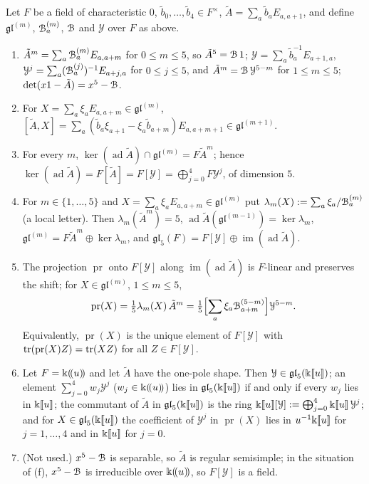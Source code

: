 \begin{lem}
\label{lem:gau-comm}
Let $F$ be a field of characteristic $0$, $\tilde b_0,\dots,\tilde b_4\in F^\times$, $\tilde A=\sum_a\tilde b_aE_{a,a+1}$, and define $\mathfrak{gl}^{(m)}$, $\mathcal{B}^{(m)}_a$, $\mathcal{B}$ and $\mathcal Y$ over $F$ as above.
\begin{enumerate}
\item[(a)] $\tilde A^m=\sum_a\mathcal{B}^{(m)}_aE_{a,a+m}$ for $0\leq m\leq5$, so $\tilde A^5=\mathcal{B}\,1$; $\mathcal Y=\sum_a\tilde b_a^{-1}E_{a+1,a}$, $\mathcal Y^j=\sum_a(\mathcal{B}^{(j)}_a)^{-1}E_{a+j,a}$ for $0\leq j\leq5$, and $\tilde A^m=\mathcal{B}\,\mathcal Y^{5-m}$ for $1\leq m\leq5$; $\det(x1-\tilde A)=x^5-\mathcal{B}$.
\item[(b)] For $X=\sum_a\xi_aE_{a,a+m}\in\mathfrak{gl}^{(m)}$, $[\tilde A,X]=\sum_a(\tilde b_a\xi_{a+1}-\xi_a\tilde b_{a+m})E_{a,a+m+1}\in\mathfrak{gl}^{(m+1)}$.
\item[(c)] For every $m$, $\ker(\operatorname{ad}\tilde A)\cap\mathfrak{gl}^{(m)}=F\tilde A^m$; hence $\ker(\operatorname{ad}\tilde A)=F[\tilde A]=F[\mathcal Y]=\bigoplus_{j=0}^4F\mathcal Y^j$, of dimension $5$.
\item[(d)] For $m\in\{1,\dots,5\}$ and $X=\sum_a\xi_aE_{a,a+m}\in\mathfrak{gl}^{(m)}$ put $\lambda_m(X):=\sum_a\xi_a/\mathcal{B}^{(m)}_a$ (a local letter). Then $\lambda_m(\tilde A^m)=5$, $\operatorname{ad}\tilde A(\mathfrak{gl}^{(m-1)})=\ker\lambda_m$, $\mathfrak{gl}^{(m)}=F\tilde A^m\oplus\ker\lambda_m$, and $\mathfrak{gl}_5(F)=F[\mathcal Y]\oplus\operatorname{im}(\operatorname{ad}\tilde A)$.
\item[(e)] The projection $\operatorname{pr}$ onto $F[\mathcal Y]$ along $\operatorname{im}(\operatorname{ad}\tilde A)$ is $F$-linear and preserves the shift; for $X\in\mathfrak{gl}^{(m)}$, $1\leq m\leq5$,
\[
\operatorname{pr}(X)=\tfrac15\lambda_m(X)\,\tilde A^m=\tfrac15\Bigl[\sum_a\xi_a\mathcal{B}^{(5-m)}_{a+m}\Bigr]\mathcal Y^{5-m}.
\]
Equivalently, $\operatorname{pr}(X)$ is the unique element of $F[\mathcal Y]$ with $\operatorname{tr}(\operatorname{pr}(X)Z)=\operatorname{tr}(XZ)$ for all $Z\in F[\mathcal Y]$.
\item[(f)] Let $F=\Bbbk(\!(u)\!)$ and let $\tilde A$ have the one-pole shape. Then $\mathcal Y\in\mathfrak{gl}_5(\Bbbk[\![ u ]\!])$; an element $\sum_{j=0}^4w_j\mathcal Y^j$ ($w_j\in\Bbbk(\!(u)\!)$) lies in $\mathfrak{gl}_5(\Bbbk[\![ u ]\!])$ if and only if every $w_j$ lies in $\Bbbk[\![ u ]\!]$; the commutant of $\tilde A$ in $\mathfrak{gl}_5(\Bbbk[\![ u ]\!])$ is the ring $\Bbbk[\![ u ]\!][\mathcal Y]:=\bigoplus_{j=0}^4\Bbbk[\![ u ]\!]\,\mathcal Y^j$; and for $X\in\mathfrak{gl}_5(\Bbbk[\![ u ]\!])$ the coefficient of $\mathcal Y^j$ in $\operatorname{pr}(X)$ lies in $u^{-1}\Bbbk[\![ u ]\!]$ for $j=1,\dots,4$ and in $\Bbbk[\![ u ]\!]$ for $j=0$.
\item[(g)] (Not used.) $x^5-\mathcal{B}$ is separable, so $\tilde A$ is regular semisimple; in the situation of (f), $x^5-\mathcal{B}$ is irreducible over $\Bbbk(\!(u)\!)$, so $F[\mathcal Y]$ is a field.
\end{enumerate}
\end{lem}

